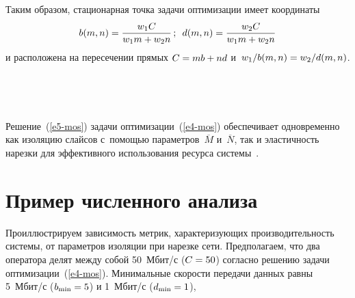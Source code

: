 \begin{multicols}{2}
  Таким образом, стационарная точка задачи оптимизации имеет 
координаты
  \begin{equation}
  b(m,n)=\displaystyle\frac{\displaystyle w_1C\mathstrut}{\displaystyle w_1m+w_2n\mathstrut}\,;\enskip
  d(m,n)=\displaystyle\frac{\displaystyle w_2C\mathstrut}{\displaystyle w_1m+w_2n\mathstrut}
  \label{e5-mos}
  \end{equation}
и расположена на пересечении прямых $C\hm= mb\hm+ nd$ 
и~$w_1/b(m,n)\hm= w_2/d(m,n)$.
  
\begin{figure*}[b] %
\vspace*{6pt}
    \begin{center}  
  \mbox{%
 \epsfxsize=162.998mm 
 }
\end{center}
\vspace*{-12pt}
\vspace*{15pt}
    \begin{center}  
  \mbox{%
 \epsfxsize=163mm 
 }
\end{center}
\vspace*{-12pt}
\end{figure*}
  
  Решение~(\ref{e5-mos}) задачи оптимизации~(\ref{e4-mos}) обеспечивает 
одновременно как изоляцию слайсов  
с~по\-мощью па\-ра\-мет\-ров~$\overline{M}$ и~$\overline{N}$, так и 
эластичность нарезки для эффективного использования ресурса 
системы~\cite{3-mos}.
  
  \section{Пример численного анализа}  %
  
  Проиллюстрируем зависимость метрик, характеризующих 
производительность системы, от пара\-метров изоляции при нарезке сети. 
Предполагаем, что два оператора делят между собой 50~Мбит/с 
($C\hm=50$) согласно решению задачи оптимизации~(\ref{e4-mos}). 
Минимальные скорости передачи данных равны 5~Мбит/с 
($b_{\min}\hm=5$) и 1~Мбит/с ($d_{\min}\hm=1$),\linebreak
\vspace*{-12pt}
\pagebreak


\end{multicols}
